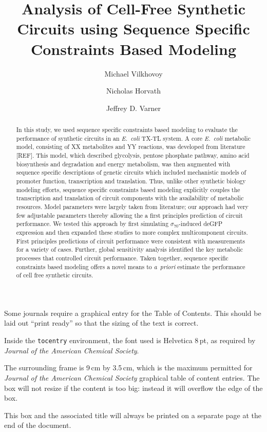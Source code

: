 \documentclass[journal=asbcd6,manuscript=article]{achemso}
\author{Michael Vilkhovoy}
\author{Nicholas Horvath}
\author{Jeffrey D. Varner}
\affiliation[Cornell University]
{Robert Frederick Smith School of Chemical and Biomolecular Engineering, Cornell University, Ithaca, NY 14853}
\title{Analysis of Cell-Free Synthetic Circuits using Sequence Specific Constraints Based Modeling}
\begin{document}
\begin{tocentry}

Some journals require a graphical entry for the Table of Contents.
This should be laid out ``print ready'' so that the sizing of the
text is correct.

Inside the \texttt{tocentry} environment, the font used is Helvetica
8\,pt, as required by \emph{Journal of the American Chemical
Society}.

The surrounding frame is 9\,cm by 3.5\,cm, which is the maximum
permitted for  \emph{Journal of the American Chemical Society}
graphical table of content entries. The box will not resize if the
content is too big: instead it will overflow the edge of the box.

This box and the associated title will always be printed on a
separate page at the end of the document.

\end{tocentry}

\begin{abstract}
In this study, we used sequence specific constraints based modeling to evaluate the performance of synthetic circuits in an \emph{E.~coli} TX-TL system.
A core \emph{E.~coli} metabolic model, consisting of XX metabolites and YY reactions, was developed from literature [REF].
This model, which described glycolysis, pentose phosphate pathway, amino acid biosynthesis and degradation and energy metabolism, was then augmented with
sequence specific descriptions of genetic circuits which included mechanistic models of promoter function, transcription and translation.
Thus, unlike other synthetic biology modeling efforts, sequence specific constraints based modeling explicitly couples
the transcription and translation of circuit components with the availability of metabolic resources.
Model parameters were largely taken from literature; our approach had very few adjustable parameters thereby allowing the a first principles prediction of circuit performance.
We tested this approach by first simulating $\sigma_{70}$-induced deGFP expression and then expanded these studies to more complex multicomponent circuits.
First principles predictions of circuit performance were consistent with measurements for a variety of cases.
Further, global sensitivity analysis identified the key metabolic processes that controlled circuit performance.
Taken together, sequence specific constraints based modeling offers a novel means to \emph{a~priori} estimate the performance of cell free synthetic circuits.
\end{abstract}
\end{document}
